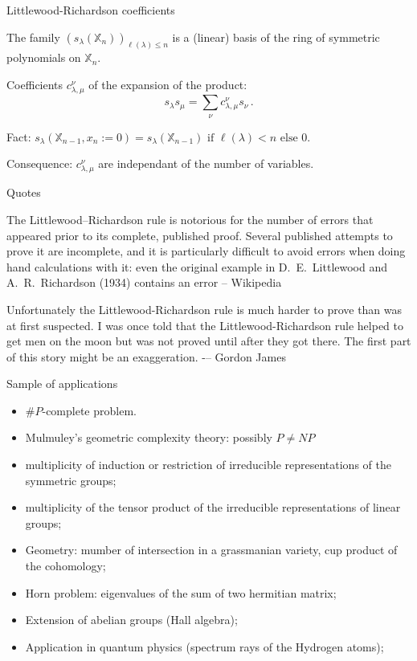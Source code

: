 \documentclass[compress,11pt]{beamer}
\newcommand{\XX}{{\mathbb X}}
\begin{document}
\begin{frame}{Littlewood-Richardson coefficients}

  \begin{PROP}
    The family $(s_\lambda(\XX_n))_{\ell(\lambda) \leq n}$ is a (linear) basis of the
    ring of symmetric polynomials on $\XX_n$.
  \end{PROP}

  \begin{DEFN}
    Coefficients $c_{\lambda,\mu}^\nu$ of the expansion of the product:
    \[
    s_\lambda s_\mu = \sum_{\nu} c_{\lambda,\mu}^\nu s_\nu\,.
    \]
  \end{DEFN}
  Fact: $s_\lambda(\XX_{n-1}, x_n := 0) =
  s_\lambda(\XX_{n-1}) \text{ if } \ell(\lambda) < n\text{ else } 0$.

  Consequence: $c_{\lambda,\mu}^\nu$ are independant of the number of variables.
\end{frame}

\begin{frame}{Quotes}

  The Littlewood–Richardson rule is notorious for the number of errors that
  appeared prior to its complete, published proof. Several published attempts
  to prove it are incomplete, and it is particularly difficult to avoid errors
  when doing hand calculations with it: even the original example in
  D.~E.~Littlewood and A.~R.~Richardson (1934) contains an error --
  Wikipedia  \bigskip

  Unfortunately the Littlewood-Richardson rule is much harder to prove than
  was at first suspected. I was once told that the Littlewood-Richardson rule
  helped to get men on the moon but was not proved until after they got
  there. The first part of this story might be an exaggeration. -– Gordon
  James

\end{frame}

\begin{frame}{Sample of applications}
  \begin{itemize}
  \item $\#P$-complete problem.
  \item Mulmuley's geometric complexity theory: possibly $P \neq NP$
  \item multiplicity of induction or restriction of irreducible representations
    of the symmetric groups;
  \item multiplicity of the tensor product of the irreducible representations
    of linear groups;
  \item Geometry: mumber of intersection in a grassmanian variety, cup product
    of the cohomology;
  \item Horn problem: eigenvalues of the sum of two hermitian matrix;
  \item Extension of abelian groups (Hall algebra);
  \item Application in quantum physics (spectrum rays of the Hydrogen atoms);
  \end{itemize}
\end{frame}
\end{document}
